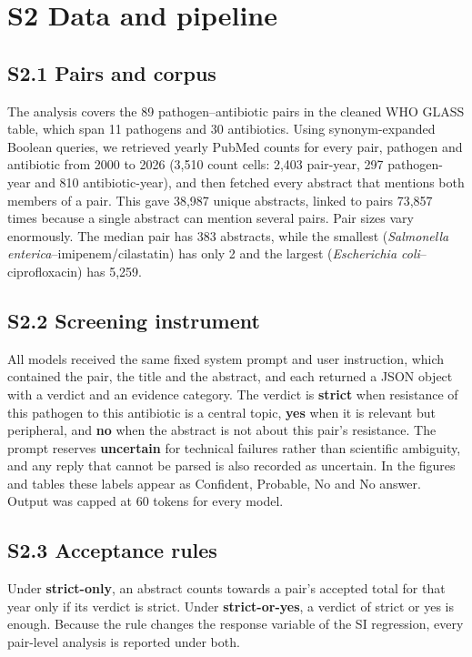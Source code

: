 \documentclass[11pt,a4paper]{article}
\begin{document}
\section{S2  Data and pipeline}
\subsection{S2.1  Pairs and corpus}
The analysis covers the 89 pathogen--antibiotic pairs in the cleaned WHO GLASS table, which span 11 pathogens and 30 antibiotics. Using synonym-expanded Boolean queries, we retrieved yearly PubMed counts for every pair, pathogen and antibiotic from 2000 to 2026 (3,510 count cells: 2,403 pair-year, 297 pathogen-year and 810 antibiotic-year), and then fetched every abstract that mentions both members of a pair. This gave 38,987 unique abstracts, linked to pairs 73,857 times because a single abstract can mention several pairs. Pair sizes vary enormously. The median pair has 383 abstracts, while the smallest (\emph{Salmonella enterica}--imipenem/cilastatin) has only 2 and the largest (\emph{Escherichia coli}--ciprofloxacin) has 5,259.

\subsection{S2.2  Screening instrument}
All models received the same fixed system prompt and user instruction, which contained the pair, the title and the abstract, and each returned a JSON object with a verdict and an evidence category. The verdict is \textbf{strict} when resistance of this pathogen to this antibiotic is a central topic, \textbf{yes} when it is relevant but peripheral, and \textbf{no} when the abstract is not about this pair's resistance. The prompt reserves \textbf{uncertain} for technical failures rather than scientific ambiguity, and any reply that cannot be parsed is also recorded as uncertain. In the figures and tables these labels appear as Confident, Probable, No and No answer. Output was capped at 60 tokens for every model.

\subsection{S2.3  Acceptance rules}
Under \textbf{strict-only}, an abstract counts towards a pair's accepted total for that year only if its verdict is strict. Under \textbf{strict-or-yes}, a verdict of strict or yes is enough. Because the rule changes the response variable of the SI regression, every pair-level analysis is reported under both.
\end{document}
